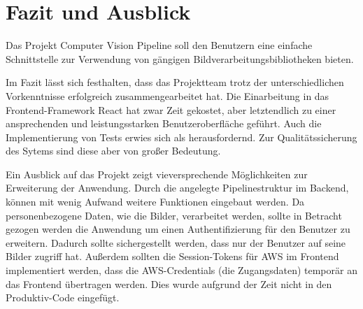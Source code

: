 \section{Fazit und Ausblick}
Das Projekt Computer Vision Pipeline soll den Benutzern eine einfache Schnittstelle zur Verwendung von gängigen Bildverarbeitungsbibliotheken bieten.

Im Fazit lässt sich festhalten, dass das Projektteam trotz der unterschiedlichen Vorkenntnisse erfolgreich zusammengearbeitet hat. Die Einarbeitung in das Frontend-Framework React hat zwar Zeit gekostet, aber letztendlich zu einer ansprechenden und leistungsstarken Benutzeroberfläche geführt. Auch die Implementierung von Tests erwies sich als herausfordernd. Zur Qualitätssicherung des Sytems sind diese aber von großer Bedeutung.

Ein Ausblick auf das Projekt zeigt vieversprechende Möglichkeiten zur Erweiterung der Anwendung. Durch die angelegte Pipelinestruktur im Backend, können mit wenig Aufwand weitere Funktionen eingebaut werden. Da personenbezogene Daten, wie die Bilder, verarbeitet werden, sollte in Betracht gezogen werden die Anwendung um einen Authentifizierung für den Benutzer zu erweitern. Dadurch sollte sichergestellt werden, dass nur der Benutzer auf seine Bilder zugriff hat. Außerdem sollten die Session-Tokens für AWS im Frontend implementiert werden, dass die AWS-Credentials (die Zugangsdaten) temporär an das Frontend übertragen werden. Dies wurde aufgrund der Zeit nicht in den Produktiv-Code eingefügt.
